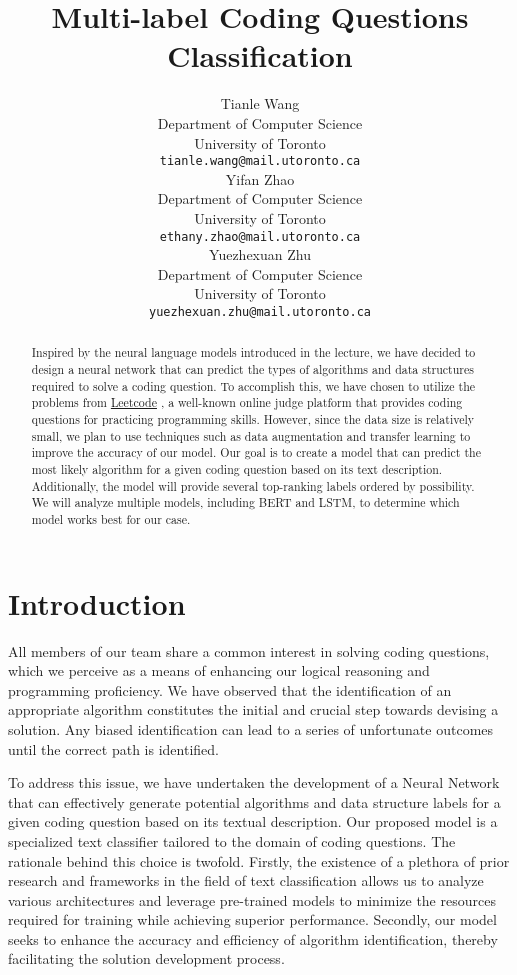 \documentclass{article}
\title{Multi-label Coding Questions Classification}
\author{%
  Tianle Wang \\
  Department of Computer Science\\
  University of Toronto\\
  \texttt{tianle.wang@mail.utoronto.ca} \\
  \And Yifan Zhao \\
  Department of Computer Science\\ 
  University of Toronto\\
  \texttt{ethany.zhao@mail.utoronto.ca} \\
  \And Yuezhexuan Zhu \\
  Department of Computer Science\\
  University of Toronto\\
  \texttt{yuezhexuan.zhu@mail.utoronto.ca} \\
}
\begin{document}
\maketitle
\begin{abstract}
Inspired by the neural language models introduced in the lecture, we have decided to design a neural network that can predict the types of algorithms and data structures required to solve a coding question. To accomplish this, we have chosen to utilize the problems from \href{https://leetcode.com/}{Leetcode} , a well-known online judge platform that provides coding questions for practicing programming skills. However, since the data size is relatively small, we plan to use techniques such as data augmentation and transfer learning to improve the accuracy of our model. Our goal is to create a model that can predict the most likely algorithm for a given coding question based on its text description. Additionally, the model will provide several top-ranking labels ordered by possibility. We will analyze multiple models, including BERT\cite{BERT} and LSTM\cite{LSTM}, to determine which model works best for our case.
\end{abstract}

\section{Introduction}
All members of our team share a common interest in solving coding questions, which we perceive as a means of enhancing our logical reasoning and programming proficiency. We have observed that the identification of an appropriate algorithm constitutes the initial and crucial step towards devising a solution. Any biased identification can lead to a series of unfortunate outcomes until the correct path is identified.

To address this issue, we have undertaken the development of a Neural Network that can effectively generate potential algorithms and data structure labels for a given coding question based on its textual description. Our proposed model is a specialized text classifier tailored to the domain of coding questions. The rationale behind this choice is twofold. Firstly, the existence of a plethora of prior research and frameworks in the field of text classification allows us to analyze various architectures and leverage pre-trained models to minimize the resources required for training while achieving superior performance. Secondly, our model seeks to enhance the accuracy and efficiency of algorithm identification, thereby facilitating the solution development process.
\end{document}
